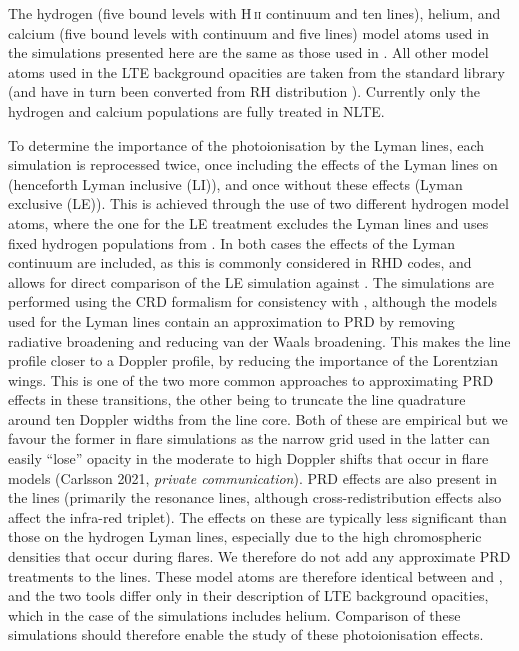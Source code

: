 The hydrogen (five bound levels with H\,\textsc{ii} continuum and ten lines), helium, and calcium (five bound \Caii{} levels with \Caiii{} continuum and five lines) model atoms used in the simulations presented here are the same as those used in \Radyn{}.
All other model atoms used in the LTE background opacities are taken from the \Lw{} standard library (and have in turn been converted from  RH distribution \citep{Uitenbroek2001}).
Currently only the hydrogen and calcium populations are fully treated in NLTE.

To determine the importance of the photoionisation by the Lyman lines, each \Radyn{} simulation is reprocessed twice, once including the effects of the Lyman lines on \Caii{} (henceforth Lyman inclusive (LI)), and once without these effects (Lyman exclusive (LE)).
This is achieved through the use of two different hydrogen model atoms, where the one for the LE treatment excludes the Lyman lines and uses fixed hydrogen populations from \Radyn{}.
In both cases the effects of the Lyman continuum are included, as this is commonly considered in RHD codes, and allows for direct comparison of the LE simulation against \Radyn{}.
The simulations are performed using the CRD formalism for consistency with \Radyn{}, although the models used for the Lyman lines contain an approximation to PRD by removing radiative broadening and reducing van der Waals broadening.
This makes the line profile closer to a Doppler profile, by reducing the importance of the Lorentzian wings.
This is one of the two more common approaches to approximating PRD effects in these transitions, the other being to truncate the line quadrature around ten Doppler widths from the line core.
Both of these are empirical but we favour the former in flare simulations as the narrow grid used in the latter can easily ``lose'' opacity in the moderate to high Doppler shifts that occur in flare models (Carlsson 2021, \emph{private communication}).
PRD effects are also present in the \Caii{} lines (primarily the resonance lines, although cross-redistribution effects also affect the infra-red triplet).
The effects on these are typically less significant than those on the hydrogen Lyman lines, especially due to the high chromospheric densities that occur during flares.
We therefore do not add any approximate PRD treatments to the \Caii{} lines.
These model atoms are therefore identical between \Radyn{} and \Lw{}, and the two tools differ only in their description of LTE background opacities, which in the case of the \Lw{} simulations includes helium.
Comparison of these simulations should therefore enable the study of these photoionisation effects.

